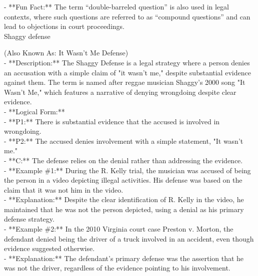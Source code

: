\documentclass[a4paper,12pt,single,pdftex]{scrbook}
\begin{document}
    
      - **Fun Fact:** The term “double-barreled question” is also used in legal contexts, where such questions are referred to as “compound questions” and can lead to objections in court proceedings.
    \\

  

Shaggy defense
    
      (Also Known As: It Wasn't Me Defense)
    \\

  
    
      - **Description:** The Shaggy Defense is a legal strategy where a person denies an accusation with a simple claim of "it wasn't me," despite substantial evidence against them. The term is named after reggae musician Shaggy's 2000 song "It Wasn't Me," which features a narrative of denying wrongdoing despite clear evidence.
    \\

    
      - **Logical Form:**
    \\

    
        - **P1:** There is substantial evidence that the accused is involved in wrongdoing.
    \\

    
        - **P2:** The accused denies involvement with a simple statement, "It wasn’t me."
    \\

    
        - **C:** The defense relies on the denial rather than addressing the evidence.
    \\

    
      - **Example \#1:** During the R. Kelly trial, the musician was accused of being the person in a video depicting illegal activities. His defense was based on the claim that it was not him in the video.
    \\

    
      - **Explanation:** Despite the clear identification of R. Kelly in the video, he maintained that he was not the person depicted, using a denial as his primary defense strategy.
    \\

    
      - **Example \#2:** In the 2010 Virginia court case Preston v. Morton, the defendant denied being the driver of a truck involved in an accident, even though evidence suggested otherwise.
    \\

    
      - **Explanation:** The defendant’s primary defense was the assertion that he was not the driver, regardless of the evidence pointing to his involvement.
    \\
\end{document}
